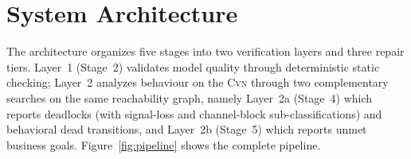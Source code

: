 
\section{System Architecture}
\label{sec:architecture}
The architecture organizes five stages into two verification layers and three repair tiers.
Layer~1 (Stage~2) validates model quality through deterministic static checking; Layer~2 analyzes behaviour on the \textsc{Cvn} through two complementary searches on the same reachability graph, namely Layer~2a (Stage~4) which reports deadlocks (with signal-loss and channel-block sub-classifications) and behavioral dead transitions, and Layer~2b (Stage~5) which reports unmet business goals. Figure~\ref{fig:pipeline} shows the complete pipeline.

